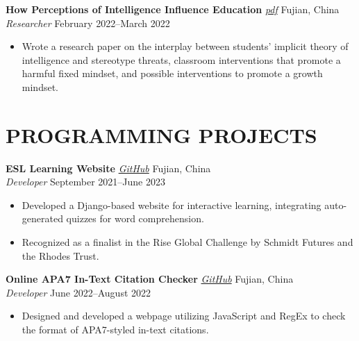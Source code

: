 \documentclass[letterpaper, 9pt]{extarticle}
\begin{document}
\noindent
\textbf{How Perceptions of Intelligence Influence Education} 
\emph{\href{https://drive.google.com/file/d/1lgQKk7_geC_NsAG5uHnPfWY3wKy38_-o/view?usp=sharing}{\color{blue} pdf}}
\hfill Fujian, China \\
\textit{Researcher} \hfill February 2022--March 2022
\begin{itemize}
    \item Wrote a research paper on the interplay between students' implicit theory of intelligence and stereotype threats, classroom interventions that promote a harmful fixed mindset, and possible interventions to promote a growth mindset. 
\end{itemize}


\section*{PROGRAMMING PROJECTS}

\noindent
\textbf{ESL Learning Website} 
\emph{\href{https://github.com/AdenChen27/Project_0}{\color{blue} GitHub}}
\hfill Fujian, China \\
\textit{Developer} \hfill September 2021--June 2023
\begin{itemize}
    \item Developed a Django-based website for interactive learning, integrating auto-generated quizzes for word comprehension. 
    \item Recognized as a finalist in the Rise Global Challenge by Schmidt Futures and the Rhodes Trust.
\end{itemize}

\noindent
\textbf{Online APA7 In-Text Citation Checker} 
\emph{\href{https://github.com/AdenChen27/AdenChen27.github.io/tree/main/citation_checker}{\color{blue} GitHub}}
\hfill Fujian, China \\
\textit{Developer} \hfill June 2022--August 2022
\begin{itemize}
    \item Designed and developed a webpage utilizing JavaScript and RegEx to check the format of APA7-styled in-text citations.
\end{itemize}
\end{document}
